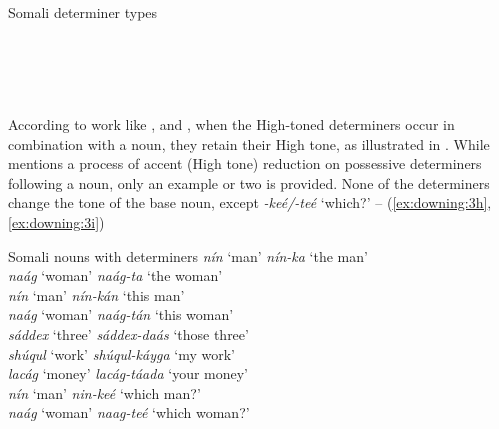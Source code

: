 \documentclass[output=paper]{langscibook}
\begin{document}
\ea  Somali determiner types \citep[111--117]{Saeed1999} \label{ex:downing:2}
  \\
  \\
  \\
  \\
  \\
  \z
\z

According to work like \citet{Green2016,Hyman1981}, and \citet{Saeed1993,Saeed1999}, when the High-toned determiners occur in combination with a noun, they retain their High tone, as illustrated in . While \citet[191]{Hyman1981} mentions a process of accent (High tone) reduction on possessive determiners following a noun, only an example or two is provided. None of the determiners change the tone of the base noun, except \textit{{}-keé/-teé} ‘which?’ – (\ref{ex:downing:3h}, \ref{ex:downing:3i})


\ea  Somali nouns with determiners \citep[160--168]{Saeed1993} \label{ex:downing:3}
  \ea  \textit{nín}  ‘man’  \textit{nín-ka}  ‘the man’\label{ex:downing:3a}\\
  \ex  \textit{naág}  ‘woman’  \textit{naág-ta}  ‘the woman’ \label{ex:downing:3b}\\
  \ex  \textit{nín}  ‘man’  \textit{nín-kán}  ‘this man’\label{ex:downing:3c}\\
  \ex  \textit{naág}  ‘woman’  \textit{naág-tán}  ‘this woman’\label{ex:downing:3d}\\
  \ex  \textit{sáddex}  ‘three’  \textit{sáddex-daás}   ‘those three’\label{ex:downing:3e}\\
  \ex  \textit{shúqul}  ‘work’  \textit{shúqul-káyga}  ‘my work’\label{ex:downing:3f}\\
  \ex  \textit{lacág}  ‘money’  \textit{lacág-táada}  ‘your money’\label{ex:downing:3g}\\
  \ex  \textit{nín}  ‘man’  \textit{nin-keé}  ‘which man?’\label{ex:downing:3h}\\
  \ex  \textit{naág}  ‘woman’  \textit{naag-teé}  ‘which woman?’\label{ex:downing:3i}\\
  \z
\z
 
\end{document}

